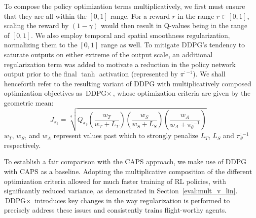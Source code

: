 \documentclass[letterpaper, 10 pt, conference]{ieeeconf} %
\newcommand{\DDPGx}{$\text{DDPG}\times$}
\begin{document}
        To compose the policy optimization terms multiplicatively, we first must ensure that they are all within the $[0,1]$ range.
        For a reward $r$ in the range $r \in [0,1]$, scaling the reward by $(1-\gamma)$ would then result in Q-values being in the range of $[0,1]$.
        We also employ temporal and spatial smoothness regularization, normalizing them to the $[0,1]$ range as well.
        To mitigate DDPG's tendency to saturate outputs on either extreme of the output scale, an additional regularization term was added to motivate a reduction in the policy network output prior to the final $\tanh$ activation (represented by $\pi^{:-1}$).
        We shall henceforth refer to the resulting variant of DDPG with multiplicatively composed optimization objectives as \DDPGx{}, whose optimization criteria are given by the geometric mean:
        \begin{equation}
            J_{\pi_\theta} = \sqrt[4]{Q_{\pi_\theta} \left(\frac{w_T}{w_T + L_T}\right) \left(\frac{w_S}{w_S + L_S}\right) \left(\frac{w_A}{w_A + \pi_{\theta}^{:-1}}\right)} \label{eq:mult_opt}
        \end{equation}
        $w_T$, $w_S$, and $w_A$ represent values past which to strongly penalize $L_T$, $L_S$ and $\pi_{\theta}^{:-1}$ respectively.
        
        To establish a fair comparison with the CAPS approach, we make use of DDPG with CAPS as a baseline. 
        Adopting the multiplicative composition of the different optimization criteria allowed for much faster training of RL policies, with significantly reduced variance, as demonstrated in Section~\ref{eval:mult_v_lin}.
        \DDPGx{} introduces key changes in the way regularization is performed to precisely address these issues and consistently trains flight-worthy agents.
        
\end{document}
